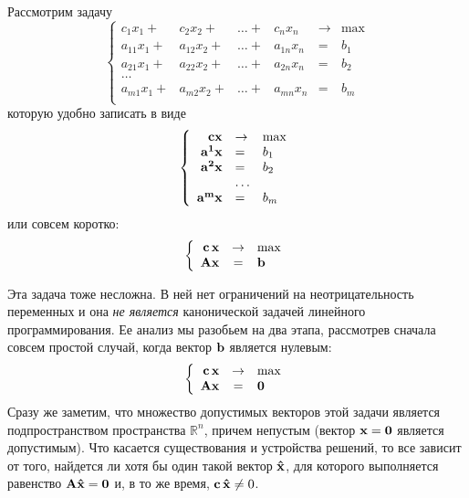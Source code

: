 Рассмотрим задачу
\begin{equation}\label{LP-RAV}
\left\{
\begin{array}{rrrrllll}
c_1 x_1 + & c_2 x_2 +    & \ldots +& c_n x_n &\to & \max\\
a_{11} x_1 + & a_{12} x_2 + &\ldots +& a_{1n} x_n &=& b_1 \\
a_{21} x_1 + & a_{22} x_2 + &\ldots +& a_{2n} x_n &=& b_2\\
                       \ldots &&&\\
a_{m1} x_1 + & a_{m2} x_2 +& \ldots +& a_{mn} x_n &=& b_m\\
\end{array} \right.
\end{equation}
которую удобно записать в виде
\begin{equation}\label{LP-RAV}
\left\{
\begin{array}{rll}
\mathbf{c}\mathbf{x}  &\to & \max\\
\mathbf{a^{1}}\mathbf{x} &=& b_1 \\
\mathbf{a^{2}}\mathbf{x}  &=& b_2\\
                      & \ldots &\\
\mathbf{a^{m}}\mathbf{x}  &=& b_m\\
\end{array} \right.
\end{equation}
или совсем коротко:
\begin{equation}\label{LP-RAV-VEC}
\left\{
\begin{array}{rcl}
 \mathbf{c} \, \mathbf{x} & \to & \max  \\
 \mathbf{A} \mathbf{x} & = & \mathbf{b} \\
 \end{array} \right.
\end{equation}

Эта задача тоже несложна. В ней нет ограничений на неотрицательность
переменных и она \emph{не является} канонической задачей линейного
программирования. Ее анализ мы разобьем на два этапа, рассмотрев
сначала совсем простой случай, когда вектор $\mathbf{b}$ является
нулевым:
\begin{equation}\label{LP-RAV-VEC-NIL}
\left\{
\begin{array}{rcl}
 \mathbf{c} \, \mathbf{x} & \to &\max  \\
 \mathbf{A} \mathbf{x}& =& \mathbf{0} \\
 \end{array} \right.
\end{equation}
Сразу же заметим, что множество допустимых векторов этой задачи является подпространством
пространства $\mathbb{R}^{n}$, причем непустым (вектор $\mathbf{x}=\mathbf{0}$ является допустимым).
Что касается существования и устройства решений, то все зависит от того, найдется ли хотя бы
один такой вектор $\mathbf{\hat{x}}$, для которого выполняется равенство $\mathbf{A} \mathbf{\hat{x}} =
\mathbf{0}$ и, в то же время, $\mathbf{c} \,\mathbf{\hat{x}}\neq0$.

